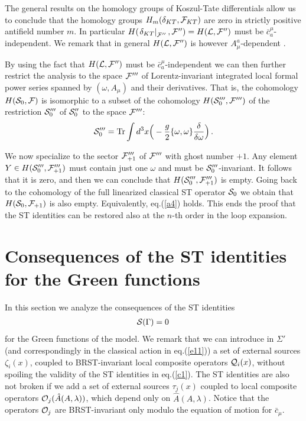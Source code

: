 \documentclass[a4paper,11pt]{article}
\def\G{\Gamma}
\begin{document}
The general results on the homology groups of Koszul-Tate differentials
\cite{Barnich:2000zw} allow us to conclude that the homology groups
$H_m(\delta_{KT},{\cal F}_{KT})$ are zero in strictly positive
antifield number $m$. In particular
$H(\left . \delta_{KT} \right |_{{\cal F}''}, {\cal F}'') =
H({\cal L},{\cal F}'')$ must be $\bar c^\mu_a$-independent.
We remark that in general $H({\cal L}, {\cal F}'')$ is however
$A_\mu^a$-dependent \cite{Barnich:2000zw}.

By using the fact that $H({\cal L},{\cal F}'')$ must be 
$\bar c^\mu_a$-independent we can then further restrict
the analysis to the space ${\cal F}'''$ of Lorentz-invariant
integrated local formal power series spanned by $(\omega, A_\mu)$ and
their derivatives.
That is, the cohomology $H({\cal S}_0,{\cal F})$
is isomorphic to a subset of the cohomology 
$H({\cal S}_0''',{\cal F}''')$ of the restriction ${\cal S}'''_0$
of ${\cal S}''_0$ to the space ${\cal F}'''$:
%
\begin{eqnarray}
{\cal S}_0''' = {\rm Tr} \int d^3x \Big ( 
- \frac{g}{2} \{ \omega, \omega \} \frac{\delta}{\delta \omega}
\Big ) \, .
\label{wz9}
\end{eqnarray}
%

We now specialize to the sector ${\cal F}'''_{+1}$ 
of ${\cal F}'''$ with ghost number $+1$.
Any element $Y \in H({\cal S}'''_0,{\cal F}'''_{+1})$
must contain just one $\omega$ and must be 
${\cal S}'''_0$-invariant. It follows that it is zero, and then 
we can conclude that  $H({\cal S}'''_0,{\cal F}'''_{+1})$  is empty.
Going back to the cohomology of the full linearized classical ST
operator ${\cal S}_0$ we obtain that $H({\cal S}_0,{\cal F}_{+1})$
is also empty. Equivalently, eq.(\ref{a4}) holds. 
This ends the proof that the ST identities 
can be restored also at the $n$-th order
in the loop expansion.

\section{Consequences of the ST identities for the Green functions}\label{sec5}

In this section we analyze the consequences 
 of the ST identities
%
\begin{eqnarray}
{\cal S}(\G) =0 \, 
\label{c1}
\end{eqnarray}
%
for the Green functions of the model.
We remark that we can introduce in $\Sigma'$ (and correspondingly in the classical action in eq.(\ref{e11}))
a set of external sources 
$\zeta_i(x)$, coupled to BRST-invariant local composite operators
${\cal Q}_i(x)$, without spoiling the validity of the ST identities
in eq.(\ref{c1}).
The ST identities are also not broken  if we add a set of external sources 
$\tau_j(x)$ coupled to local composite operators 
${\cal O}_j(\hat A(A,\lambda))$, which depend only on $\hat A(A,\lambda)$.
Notice that the operators 
${\cal O}_j$ are BRST-invariant only modulo the equation
of motion for $\bar c_\mu$.
\end{document}
